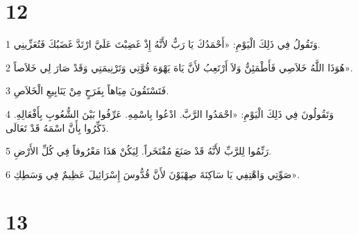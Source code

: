 \chapter{12}

\par 1 وَتَقُولُ فِي ذَلِكَ الْيَوْمِ: «أَحْمَدُكَ يَا رَبُّ لأَنَّهُ إِذْ غَضِبْتَ عَلَيَّ ارْتَدَّ غَضَبُكَ فَتُعَزِّينِي.
\par 2 هُوَذَا اللَّهُ خَلاَصِي فَأَطْمَئِنُّ وَلاَ أَرْتَعِبُ لأَنَّ يَاهَ يَهْوَهَ قُوَّتِي وَتَرْنِيمَتِي وَقَدْ صَارَ لِي خَلاَصاً».
\par 3 فَتَسْتَقُونَ مِيَاهاً بِفَرَحٍ مِنْ يَنَابِيعِ الْخَلاَصِ.
\par 4 وَتَقُولُونَ فِي ذَلِكَ الْيَوْمِ: «احْمَدُوا الرَّبَّ. ادْعُوا بِاسْمِهِ. عَرِّفُوا بَيْنَ الشُّعُوبِ بِأَفْعَالِهِ. ذَكِّرُوا بِأَنَّ اسْمَهُ قَدْ تَعَالَى.
\par 5 رَنِّمُوا لِلرَّبِّ لأَنَّهُ قَدْ صَنَعَ مُفْتَخَراً. لِيَكُنْ هَذَا مَعْرُوفاً فِي كُلِّ الأَرْضِ.
\par 6 صَوِّتِي وَاهْتِفِي يَا سَاكِنَةَ صِهْيَوْنَ لأَنَّ قُدُّوسَ إِسْرَائِيلَ عَظِيمٌ فِي وَسَطِكِ».

\chapter{13}

